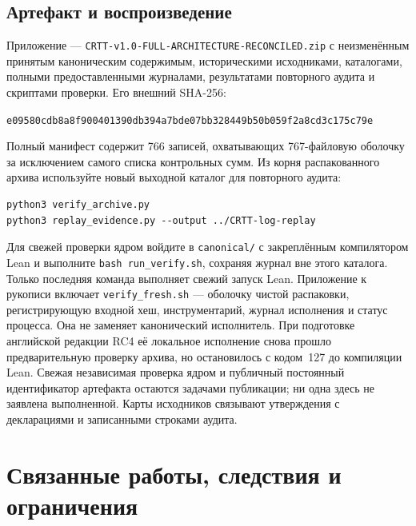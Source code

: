 \documentclass[10pt,a4paper]{article}
\newcommand{\rc}[1]{\allowbreak\texttt{#1}\allowbreak}
\begin{document}
\subsection{Артефакт и воспроизведение}\label{sec:artifact}
Приложение --- \rc{CRTT-v1.0-FULL-ARCHITECTURE-RECONCILED.zip} \cite{crttartifact} с неизменённым принятым каноническим содержимым, историческими исходниками, каталогами, полными предоставленными журналами, результатами повторного аудита и скриптами проверки. Его внешний SHA-256:
\begin{center}\small\texttt{e09580cdb8a8f900401390db394a7bde07bb328449b50b059f2a8cd3c175c79e}\end{center}
Полный манифест содержит 766 записей, охватывающих 767-файловую оболочку за исключением самого списка контрольных сумм. Из корня распакованного архива используйте новый выходной каталог для повторного аудита:
\begin{verbatim}
python3 verify_archive.py
python3 replay_evidence.py --output ../CRTT-log-replay
\end{verbatim}
Для свежей проверки ядром войдите в \rc{canonical/} с закреплённым компилятором Lean и выполните \verb|bash run_verify.sh|, сохраняя журнал вне этого каталога. Только последняя команда выполняет свежий запуск Lean. Приложение к рукописи включает \rc{verify\_fresh.sh} --- оболочку чистой распаковки, регистрирующую входной хеш, инструментарий, журнал исполнения и статус процесса. Она не заменяет канонический исполнитель. При подготовке английской редакции RC4 её локальное исполнение снова прошло предварительную проверку архива, но остановилось с кодом~127 до компиляции Lean. Свежая независимая проверка ядром и публичный постоянный идентификатор артефакта остаются задачами публикации; ни одна здесь не заявлена выполненной. Карты исходников связывают утверждения с декларациями и записанными строками аудита.
\section{Связанные работы, следствия и ограничения}\label{sec:related}
\end{document}
